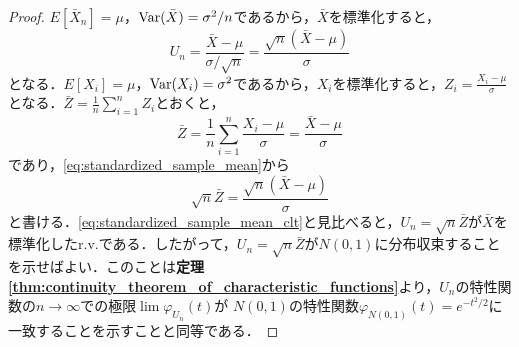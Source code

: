 \documentclass[main.tex]{subfiles}
\begin{document}
\begin{proof}
$E[\bar{X}_n] = \mu$，$\operatorname{Var}(\bar{X}) = \sigma^2/n$であるから，$\bar{X}$を標準化すると，
\begin{equation}
  U_n = \frac{\bar{X} - \mu}{\sigma/\sqrt{n}} = \frac{\sqrt{n}(\bar{X} - \mu)}{\sigma}
  \label{eq:standardized_sample_mean_clt}
\end{equation}
となる．$E[X_i] = \mu$，$\operatorname{Var}(X_i) = \sigma^2$であるから，$X_i$を標準化すると，$Z_i = \frac{X_i - \mu}{\sigma} $となる．$\bar{Z} = \frac{1}{n} \sum_{i=1}^{n} Z_i$とおくと，
\begin{equation}
  \bar{Z} = \frac{1}{n} \sum_{i=1}^{n} \frac{X_i - \mu}{\sigma} = \frac{\bar{X} - \mu}{\sigma}
  \label{eq:standardized_sample_mean}
\end{equation}
であり，\eqref{eq:standardized_sample_mean}から
\begin{equation}
  \sqrt{n} \bar{Z} = \frac{\sqrt{n}(\bar{X} - \mu)}{\sigma} 
\end{equation}
と書ける．\eqref{eq:standardized_sample_mean_clt}と見比べると，$U_n = \sqrt{n} \bar{Z}$が$\bar{X}$を標準化したr.v.である．したがって，$U_n = \sqrt{n} \bar{Z}$が$N(0,1)$に分布収束することを示せばよい．このことは\textbf{定理 \ref{thm:continuity_theorem_of_characteristic_functions}}より，$U_n$の特性関数の$n \to \infty$での極限$\lim \varphi_{U_n}(t)$が
$N(0,1)$の特性関数$\varphi_{N(0,1)}(t) = e^{-t^2/2}$に一致することを示すことと同等である．


\end{proof}
\end{document}
